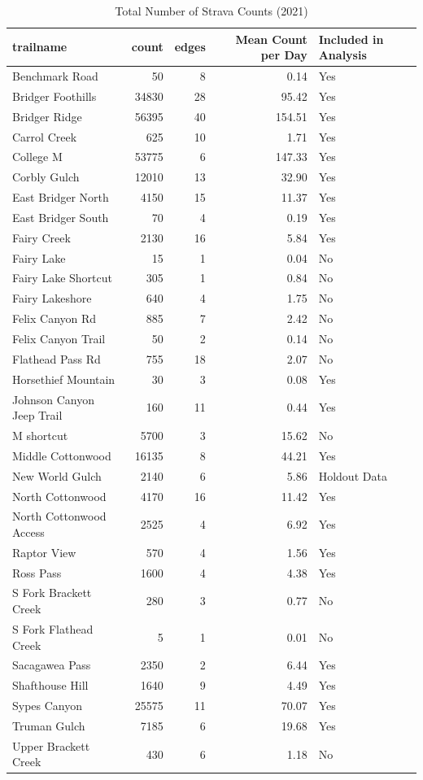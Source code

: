 \documentclass[
]{book}
\begin{document}
\begin{table}

\caption{\label{tab:strava-summary}Total Number of Strava Counts (2021)}
\centering
\begin{tabular}[t]{lrrrl}
\toprule
trailname & count & edges & Mean Count per Day & Included in Analysis\\
\midrule
Benchmark Road & 50 & 8 & 0.14 & Yes\\
Bridger Foothills & 34830 & 28 & 95.42 & Yes\\
Bridger Ridge & 56395 & 40 & 154.51 & Yes\\
Carrol Creek & 625 & 10 & 1.71 & Yes\\
College M & 53775 & 6 & 147.33 & Yes\\
\addlinespace
Corbly Gulch & 12010 & 13 & 32.90 & Yes\\
East Bridger North & 4150 & 15 & 11.37 & Yes\\
East Bridger South & 70 & 4 & 0.19 & Yes\\
Fairy Creek & 2130 & 16 & 5.84 & Yes\\
Fairy Lake & 15 & 1 & 0.04 & No\\
\addlinespace
Fairy Lake Shortcut & 305 & 1 & 0.84 & No\\
Fairy Lakeshore & 640 & 4 & 1.75 & No\\
Felix Canyon Rd & 885 & 7 & 2.42 & No\\
Felix Canyon Trail & 50 & 2 & 0.14 & No\\
Flathead Pass Rd & 755 & 18 & 2.07 & No\\
\addlinespace
Horsethief Mountain & 30 & 3 & 0.08 & Yes\\
Johnson Canyon Jeep Trail & 160 & 11 & 0.44 & Yes\\
M shortcut & 5700 & 3 & 15.62 & No\\
Middle Cottonwood & 16135 & 8 & 44.21 & Yes\\
New World Gulch & 2140 & 6 & 5.86 & Holdout Data\\
\addlinespace
North Cottonwood & 4170 & 16 & 11.42 & Yes\\
North Cottonwood Access & 2525 & 4 & 6.92 & Yes\\
Raptor View & 570 & 4 & 1.56 & Yes\\
Ross Pass & 1600 & 4 & 4.38 & Yes\\
S Fork Brackett Creek & 280 & 3 & 0.77 & No\\
\addlinespace
S Fork Flathead Creek & 5 & 1 & 0.01 & No\\
Sacagawea Pass & 2350 & 2 & 6.44 & Yes\\
Shafthouse Hill & 1640 & 9 & 4.49 & Yes\\
Sypes Canyon & 25575 & 11 & 70.07 & Yes\\
Truman Gulch & 7185 & 6 & 19.68 & Yes\\
\addlinespace
Upper Brackett Creek & 430 & 6 & 1.18 & No\\
\bottomrule
\end{tabular}
\end{table}
\end{document}
